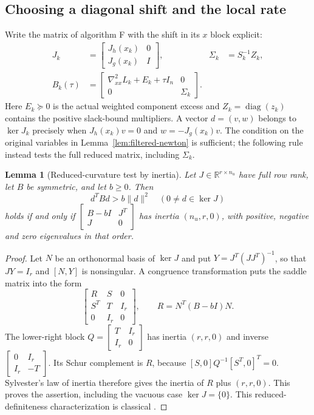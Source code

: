 \documentclass[pdflatex,sn-mathphys-num]{sn-jnl}
\theoremstyle{thmstyleone}
\newtheorem{lemma}[theorem]{Lemma}
\theoremstyle{thmstylethree}
\newcounter{algorithm}
\begin{document}
\subsection*{Choosing a diagonal shift and the local rate}
\label{sec:margin-bridge}
Write the matrix of algorithm F with the shift in its $x$ block explicit:
\[
\begin{aligned}
 J_k&=\begin{bmatrix}J_h(x_k)&0\\J_g(x_k)&I\end{bmatrix},
 &\Sigma_k&=S_k^{-1}Z_k,\\
 B_k(\tau)&=\begin{bmatrix}
 \nabla^2_{xx}L_k+E_k+\tau I_n&0\\0&\Sigma_k
 \end{bmatrix}.
\end{aligned}
\]
Here $E_k\succeq0$ is the actual weighted component excess and
$Z_k=\operatorname{diag}(z_k)$ contains the positive slack-bound
multipliers. A vector $d=(v,w)$ belongs to $\ker J_k$ precisely when
$J_h(x_k)v=0$ and $w=-J_g(x_k)v$.
The condition on the original variables in Lemma~\ref{lem:filtered-newton} is sufficient;
the following rule instead tests the full reduced matrix, including
$\Sigma_k$.

\begin{lemma}[Reduced-curvature test by inertia]\label{lem:margin-inertia}
Let $J\in\mathbb R^{r\times n_u}$ have full row rank, let $B$ be symmetric,
and let $b\geq0$. Then
\[
 d^TBd>b\|d\|^2\quad(0\ne d\in\ker J)
\]
holds if and only if
$\begin{bmatrix}B-bI&J^T\\J&0\end{bmatrix}$ has inertia
$(n_u,r,0)$, with positive, negative and zero eigenvalues in that order.
\end{lemma}
\begin{proof}
Let $N$ be an orthonormal basis of $\ker J$ and put
$Y=J^T(JJ^T)^{-1}$, so that $JY=I_r$ and $[N,Y]$ is nonsingular.
A congruence transformation puts the saddle matrix into the form
\[
 \begin{bmatrix}R&S&0\\S^T&T&I_r\\0&I_r&0\end{bmatrix},
 \qquad R=N^T(B-bI)N.
\]
The lower-right block $Q=\begin{bmatrix}T&I_r\\I_r&0\end{bmatrix}$
has inertia $(r,r,0)$ and inverse
$\begin{bmatrix}0&I_r\\I_r&-T\end{bmatrix}$.
Its Schur complement is $R$, because
$[S,0]Q^{-1}[S^T,0]^T=0$.
Sylvester's law of inertia therefore gives the inertia of $R$ plus
$(r,r,0)$. This proves the assertion, including the vacuous case
$\ker J=\{0\}$. This reduced-definiteness characterization is classical
\citep{ChabrillacCrouzeix1984,Gould1985}.
\end{proof}
\end{document}
